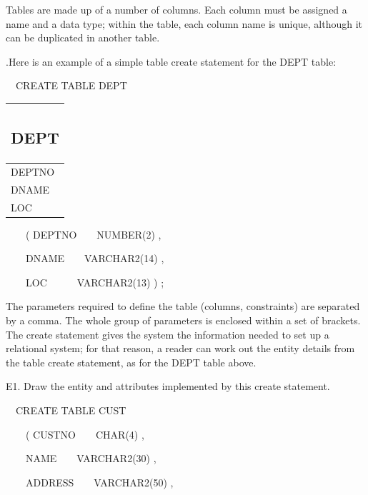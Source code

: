 
Tables are made up of a number of columns. Each column must be assigned a name and a data type; within the table, each column name is unique, although it can be duplicated in another table.

.Here is an example of a simple table create statement for the DEPT table:

\ \ CREATE TABLE DEPT

\begin{center}
\begin{minipage}{2.249cm}
\begin{flushleft}
\tablefirsthead{}
\tablehead{}
\tabletail{}
\tablelasttail{}
\begin{supertabular}{|m{2.049cm}|}
\hline
\subsection[DEPT]{DEPT}
\\\hline
DEPTNO\\
DNAME\\
LOC\\\hline
\end{supertabular}
\end{flushleft}
\end{minipage}
\end{center}
\ \ \ \ ( DEPTNO\ \ \ \ NUMBER(2) ,

\ \ \ \  DNAME\ \ \ \ VARCHAR2(14) ,

\ \ \ \  LOC\ \ \ \ \ \ VARCHAR2(13)  ) ;

The parameters required to define the table (columns, constraints) are separated by a comma. The whole group of parameters is enclosed within a set of brackets. The create statement gives the system the information needed to set up a relational system; for that reason, a reader can work out the entity details from the table create statement, as for the DEPT table above.

E1. Draw the entity and attributes implemented by this create statement.



\begin{center}
\begin{minipage}{5.914cm}
\end{minipage}
\end{center}
\ \ CREATE TABLE CUST

\ \ \ \ ( CUSTNO\ \ \ \ CHAR(4) ,

\ \ \ \  NAME\ \ \ \ VARCHAR2(30) ,

\ \ \ \  ADDRESS\ \ \ \ VARCHAR2(50) ,

